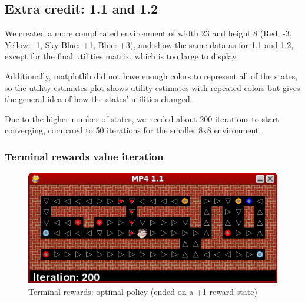 \newpage
\subsection{Extra credit: 1.1 and 1.2}
We created a more complicated environment of width 23 and height 8 (Red: -3, Yellow: -1, Sky Blue: +1, Blue: +3), and show the same data as for 1.1 and 1.2, except for the final utilities matrix, which is too large to display.

Additionally, matplotlib did not have enough colors to represent all of the states, so the utility estimates plot shows utility estimates with repeated colors but gives the general idea of how the states' utilities changed.

Due to the higher number of states, we needed about 200 iterations to start converging, compared to 50 iterations for the smaller 8x8 environment.

\subsubsection{Terminal rewards value iteration}
\begin{figure}[H]
  \centering
  \includegraphics[width=0.5\linewidth]{graphics/term_11ec_opti_policy.png}
  \caption{Terminal rewards: optimal policy (ended on a +1 reward state)}
\end{figure}

